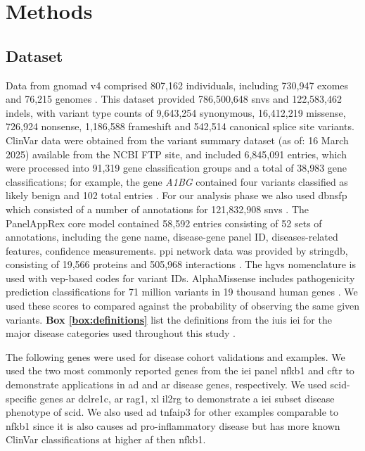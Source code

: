
\clearpage
\section{Methods}
\subsection{Dataset}

Data from \ac{gnomad} v4 comprised 807,162 individuals, including 730,947 exomes and 76,215 genomes \cite{karczewski2020mutational}. This dataset provided 786,500,648 \ac{snv}s and 122,583,462 \ac{indel}s, with variant type counts of 9,643,254 synonymous, 16,412,219 missense, 726,924 nonsense, 1,186,588 frameshift and 542,514 canonical splice site variants. ClinVar data were obtained from the variant summary dataset (as of: 16 March 2025) available from the NCBI FTP site, and included 6,845,091 entries, which were processed into 91,319 gene classification groups and a total of 38,983 gene classifications; for example, the gene \textit{A1BG} contained four variants classified as likely benign and 102 total entries \cite{landrum_clinvar_2018}. For our analysis phase we also used \ac{dbnsfp} which consisted of a number of annotations for 121,832,908 \ac{snv}s 
\cite{liu_dbnsfp_2020}. 
The PanelAppRex core model contained 58,592 entries consisting of 52 sets of annotations, including the gene name, disease-gene panel ID, diseases-related features, confidence measurements.
\cite{lawless_panelapprex_2025}
\ac{ppi} network data was provided by \ac{stringdb}, consisting of 19,566 proteins and 505,968 interactions \cite{szklarczyk2025string}.
The \ac{hgvs} nomenclature is used with \ac{vep}-based codes for variant IDs.
AlphaMissense includes pathogenicity prediction classifications for 71 million variants in 19 thousand human genes \cite{cheng_accurate_2023, jun_cheng_2023_8208688}. We used these scores to compared against the probability of observing the same given variants.
\textbf{Box \ref{box:definitions}} list the definitions from the \ac{iuis} \ac{iei} for the major disease categories used throughout this study \cite{poli_human_2025}.

The following genes were used for disease cohort validations and examples.
We used the two most commonly reported genes from the \ac{iei} panel \ac{nfkb1} 
\cite{tuijnenburgNFKB12018,
who1997primary,
cunningham1999common,
oksenhendler2008infections}
and \ac{cftr} 
\cite{naito2023uk, castellani2013cftr2, Grasemann2023cftr}
to demonstrate applications in \ac{ad} and \ac{ar} disease genes, respectively.
We used \ac{scid}-specific genes 
\ac{ar} \ac{dclre1c},
\ac{ar} \ac{rag1},
\ac{xl} \ac{il2rg} to demonstrate a \ac{iei} subset disease phenotype of 
\ac{scid}.
We also used \ac{ad} \ac{tnfaip3} for other examples comparable to \ac{nfkb1} since it is also causes \ac{ad} pro-inflammatory disease but has more known ClinVar classifications at higher \ac{af} then \ac{nfkb1}.

